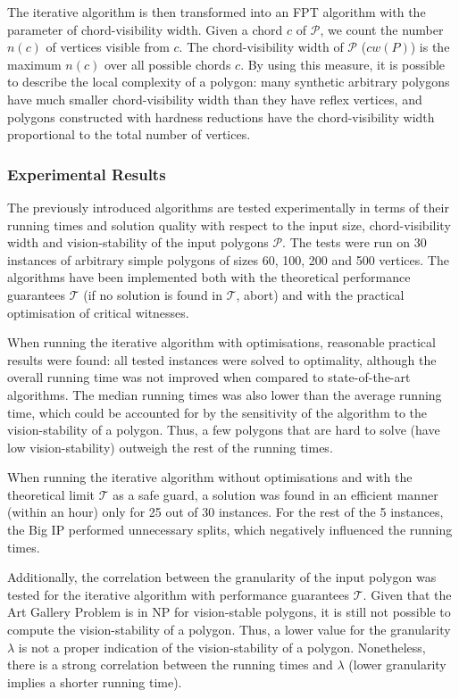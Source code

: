 The iterative algorithm is then transformed into an FPT algorithm with the parameter of chord-visibility width. Given a chord $c$ of $\mathcal P$, we count the number $n(c)$ of vertices visible from $c$. The chord-visibility width of $\mathcal P$ ($cw(P)$)  is the maximum $n(c)$ over all possible chords $c$. By using this measure, it is possible to describe the local complexity of a polygon: many synthetic arbitrary polygons have much smaller chord-visibility width than they have reflex vertices, and polygons constructed with hardness reductions have the chord-visibility width proportional to the total number of vertices. 

\subsubsection{Experimental Results}
The previously introduced algorithms are tested experimentally in terms of their running times and solution quality with respect to the input size, chord-visibility width and vision-stability of the input polygons $\mathcal P$. The tests were run on 30 instances of arbitrary simple polygons of sizes 60, 100, 200 and 500 vertices. The algorithms have been implemented both with the theoretical performance guarantees $\mathcal T$ (if no solution is found in $\mathcal T$, abort) and with the practical optimisation of critical witnesses.

When running the iterative algorithm with optimisations, reasonable practical results were found: all tested instances were solved to optimality, although the overall running time was not improved when compared to state-of-the-art algorithms. The median running times was also lower than the average running time, which could be accounted for by the sensitivity of the algorithm to the vision-stability of a polygon. Thus, a few polygons that are hard to solve (have low vision-stability) outweigh the rest of the running times.

When running the iterative algorithm without optimisations and with the theoretical limit $\mathcal T$ as a safe guard, a solution was found in an efficient manner (within an hour) only for 25 out of 30 instances. For the rest of the 5 instances, the Big IP performed unnecessary splits, which negatively influenced the running times.

Additionally, the correlation between the granularity of the input polygon was tested for the iterative algorithm with performance guarantees $\mathcal T$. Given that the Art Gallery Problem \cite{o1987art} is in NP \cite{1057165} for vision-stable polygons, it is still not possible to compute the vision-stability of a polygon. Thus, a lower value for the granularity $\lambda$ is not a proper indication of the vision-stability of a polygon. Nonetheless, there is a strong correlation between the running times and $\lambda$ (lower granularity implies a shorter running time).

